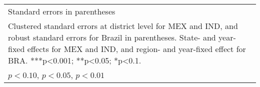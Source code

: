 \begin{table}[htbp]
{\begin{tabular}{l*{9}{c}}
\hline\hline
\multicolumn{10}{l}{\footnotesize Standard errors in parentheses}\\
\multicolumn{10}{l}{\footnotesize Clustered standard errors at district level for MEX and IND, and robust standard errors for Brazil in parentheses. State- and year-fixed effects for MEX and IND, and region- and year-fixed effect for BRA. ***p<0.001; **p<0.05; *p<0.1.}\\
\multicolumn{10}{l}{\footnotesize \sym{*} \(p<0.10\), \sym{**} \(p<0.05\), \sym{***} \(p<0.01\)}\\
\end{tabular}}
\end{table}
